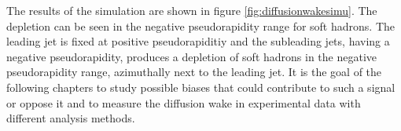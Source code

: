 \documentclass[
  a4paper,
  12pt,
  oneside,
  parskip=half,
  listof=totoc,
  bibliography=totoc,
  DIV=12,
  numbers=noenddot,
  BA.tex
  ]{subfiles}
\begin{document}
The results of the simulation are shown in figure \ref{fig:diffusionwakesimu}. The depletion can be seen in the negative pseudorapidity range for soft hadrons. The leading jet is fixed at positive pseudorapiditiy and the subleading jets, having a negative pseudorapidity, produces a depletion of soft hadrons in the negative pseudorapidity range, azimuthally next to the leading jet. It is the goal of the following chapters to study possible biases that could contribute to such a signal or oppose it and to measure the diffusion wake in experimental data with different analysis methods.
\end{document}
